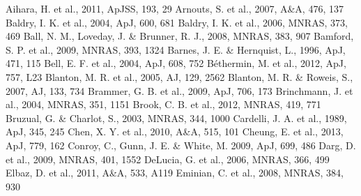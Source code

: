 \documentclass{mn2e}
\begin{document}
\begin{thebibliography}{}
 Aihara, H. et al., 2011, ApJSS, 193, 29
 Arnouts, S. et al., 2007, A\&A, 476, 137
 Baldry, I. K. et al., 2004, ApJ, 600, 681
 Baldry, I. K. et al., 2006, MNRAS, 373, 469
 Ball, N. M., Loveday, J. \& Brunner, R. J., 2008, MNRAS, 383, 907
 Bamford, S. P. et al., 2009, MNRAS, 393, 1324
 Barnes, J. E. \& Hernquist, L., 1996, ApJ, 471, 115
 Bell, E. F. et al., 2004, ApJ, 608, 752
 B\'ethermin, M. et al., 2012, ApJ, 757, L23
 Blanton, M. R. et al., 2005, AJ, 129, 2562
 Blanton, M. R. \& Roweis, S., 2007, AJ, 133, 734
 Brammer, G. B. et al., 2009, ApJ, 706, 173
 Brinchmann, J. et al., 2004, MNRAS, 351, 1151
 Brook, C. B. et al., 2012, MNRAS, 419, 771
 Bruzual, G. \& Charlot, S., 2003, MNRAS, 344, 1000
 Cardelli, J. A. et al., 1989, ApJ, 345, 245
 Chen, X. Y. et al., 2010, A\&A, 515, 101
 Cheung, E. et al., 2013, ApJ, 779, 162
 Conroy, C., Gunn, J. E. \& White, M. 2009, ApJ, 699, 486
 Darg, D. et al., 2009, MNRAS, 401, 1552
 DeLucia, G. et al., 2006, MNRAS, 366, 499
 Elbaz, D. et al., 2011, A\&A, 533, A119
 Eminian, C. et al., 2008, MNRAS, 384, 930

\end{thebibliography}
\end{document}
